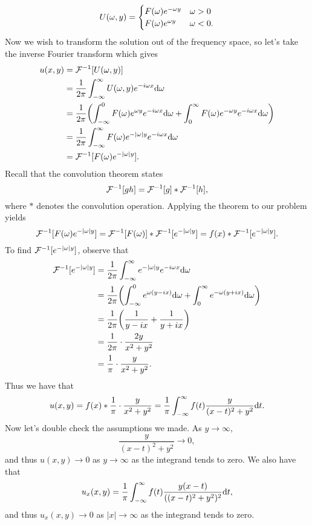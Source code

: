 \documentclass[12pt]{report}
\begin{document}
\begin{solution}
    \[
        U({\omega},y) = \begin{cases}
            F({\omega})e^{-{\omega} y} &{\omega}>0\\
            F({\omega})e^{{\omega} y} &{\omega}<0.
        \end{cases}
    \]
    Now we wish to transform the solution out of the frequency space, so let's take the inverse Fourier transform which gives
    \begin{align*}
        u(x,y) &= {\mathcal{F}}^{-1}[U({\omega},y)]\\
        &= \frac{1}{2\pi}\int_{-\infty}^{\infty}U({\omega},y)e^{-i{\omega} x}{\mathrm{d}}{\omega}\\
        &= \frac{1}{2\pi}{\left(\int_{-\infty}^0 F({\omega})e^{{\omega} y}e^{-i {\omega} x}{\mathrm{d}}{\omega} + \int^{\infty}_0 F({\omega})e^{-{\omega} y}e^{-i {\omega} x}{\mathrm{d}}{\omega}\right)}\\
        &= \frac{1}{2\pi} \int_{-\infty}^{\infty}F({\omega})e^{-|{\omega}|y}e^{-i{\omega} x}{\mathrm{d}}{\omega}\\
        &= {\mathcal{F}}^{-1}[F({\omega})e^{-|{\omega}|y}].
    \end{align*}
    Recall that the convolution theorem states
    \[ 
        {\mathcal{F}}^{-1}[gh] = {\mathcal{F}}^{-1}[g] * {\mathcal{F}}^{-1}[h],
    \]
    where $*$ denotes the convolution operation. Applying the theorem to our problem yields
    \[ 
        {\mathcal{F}}^{-1}[F({\omega})e^{-|{\omega}|y}] = {\mathcal{F}}^{-1}[F({\omega} )] * {\mathcal{F}}^{-1}[e^{-|{\omega}|y}] = f(x) * {\mathcal{F}}^{-1}[e^{-|{\omega}|y}].
    \]
    To find ${\mathcal{F}}^{-1}[e^{-|{\omega}|y}]$, observe that
    \begin{align*}
        {\mathcal{F}}^{-1}[e^{-|{\omega}|y}] &= \frac{1}{2\pi}\int_{-\infty}^{\infty} e^{-|{\omega}|y}e^{-i{\omega} x}{\mathrm{d}}{\omega}\\
        &=\frac{1}{2\pi}{\left(\int_{-\infty}^{0}e^{{\omega}(y-ix)}{\mathrm{d}}{\omega} + \int_0^\infty e^{-{\omega}(y+ix)}{\mathrm{d}}{\omega} \right)}\\
        &=\frac{1}{2\pi}{\left(\frac{1}{y-ix} + \frac{1}{y+ix}\right)}\\
        &= \frac{1}{2\pi}\cdot \frac{2y}{x^2 + y^2}\\
        &= \frac{1}{\pi} \cdot \frac{y}{x^2 + y^2}. 
    \end{align*}
    Thus we have that
    \[
        u(x,y) = f(x) * \frac{1}{\pi} \cdot \frac{y}{x^2 + y^2} = \frac{1}{\pi}\int_{-\infty}^{\infty}f(t) \frac{y}{(x-t)^2 + y^2}{\mathrm{d}} t.
    \]
    Now let's double check the assumptions we made. As $y \to \infty$, 
    \[ 
        \frac{y}{(x-t)^2 + y^2} \to 0,
    \]
    and thus $u(x,y ) \to 0$ as $y \to \infty$ as the integrand tends to zero. We also have that
    \[ 
        u_x(x,y) = \frac{1}{\pi}\int_{-\infty}^{\infty}f(t) \frac{y(x - t)}{((x-t)^2 + y^2)^2}{\mathrm{d}} t,
    \] 
    and thus $u_x(x,y) \to 0$ as $|x| \to \infty$ as the integrand tends to zero.

    \end{solution}
    
\end{document}
